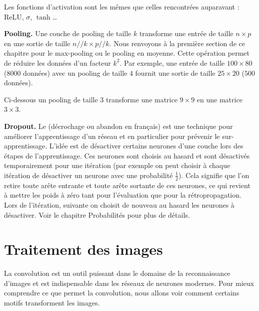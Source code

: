 \documentclass[11pt,class=report,crop=false]{standalone}
\begin{document}
Les fonctions d'activation sont les mêmes que celles rencontrées auparavant : ReLU, $\sigma$, $\tanh$\ldots

\bigskip
\textbf{Pooling.}
Une couche de pooling de taille $k$ transforme une entrée de taille $n \times p$ en une sortie de taille $n//k \times p//k$.
Nous renvoyons à la première section de ce chapitre pour le max-pooling ou le pooling en moyenne. Cette opération permet de réduire les données d'un facteur $k^2$.
Par exemple, une entrée de taille $100 \times 80$ ($8 000$ données) avec un pooling de taille $4$ fournit une sortie de taille $25 \times 20$ ($500$ données).

Ci-dessous un pooling de taille $3$ transforme une matrice $9\times 9$ en une matrice $3\times 3$.


\bigskip
\textbf{Dropout.} 
Le  (décrochage ou abandon en français) est une technique pour améliorer l'apprentissage d'un réseau et en particulier pour prévenir le sur-apprentissage. L'idée est de désactiver certains neurones d'une couche lors des étapes de l'apprentissage. Ces neurones sont choisis au hasard et sont désactivés temporairement pour une itération (par exemple on peut choisir à chaque itération de désactiver un neurone avec une probabilité $\frac12$). Cela signifie que l'on retire toute arête entrante et toute arête sortante de ces neurones, ce qui revient à mettre les poids à zéro tant pour l'évaluation que pour la rétropropagation. Lors de l'itération, suivante on choisit de nouveau au hasard les neurones à désactiver.
Voir le chapitre \og{}Probabilités\fg{} pour plus de détails. 




\section{Traitement des images}

La convolution est un outil puissant dans le domaine de la reconnaissance d'images et est indispensable dans les réseaux de neurones modernes. Pour mieux comprendre ce que permet la convolution, nous allons voir comment certains motifs transforment les images.
\end{document}
